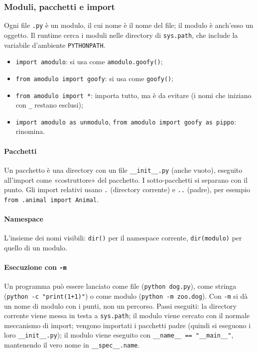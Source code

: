 \documentclass[a4paper,12pt]{article}
\begin{document}
\subsubsection{Moduli, pacchetti e import}
Ogni file \texttt{.py} è un modulo, il cui nome è il nome del file; il modulo è anch'esso
un oggetto. Il runtime cerca i moduli nelle directory di \texttt{sys.path}, che include
la variabile d'ambiente \texttt{PYTHONPATH}.
\begin{itemize}[nosep]
  \item \texttt{import amodulo}: si usa come \texttt{amodulo.goofy()};
  \item \texttt{from amodulo import goofy}: si usa come \texttt{goofy()};
  \item \texttt{from amodulo import *}: importa tutto, ma è da evitare (i nomi che iniziano
        con \texttt{\_} restano esclusi);
  \item \texttt{import amodulo as unmodulo}, \texttt{from amodulo import goofy as pippo}:
        rinomina.
\end{itemize}

\paragraph{Pacchetti} Un pacchetto è una directory con un file \texttt{\_\_init\_\_.py}
(anche vuoto), eseguito all'import come «costruttore» del pacchetto. I sotto-pacchetti si
separano con il punto. Gli import relativi usano \texttt{.} (directory corrente) e
\texttt{..} (padre), per esempio \texttt{from .animal import Animal}.

\paragraph{Namespace} L'insieme dei nomi visibili: \texttt{dir()} per il namespace corrente,
\texttt{dir(modulo)} per quello di un modulo.

\paragraph{Esecuzione con \texttt{-m}} Un programma può essere lanciato come file
(\texttt{python dog.py}), come stringa (\texttt{python -c "print(1+1)"}) o come modulo
(\texttt{python -m zoo.dog}). Con \texttt{-m} si dà un nome di modulo con i punti, non un
percorso. Passi eseguiti: la directory corrente viene messa in testa a \texttt{sys.path};
il modulo viene cercato con il normale meccanismo di import; vengono importati i pacchetti
padre (quindi si eseguono i loro \texttt{\_\_init\_\_.py}); il modulo viene eseguito con
\texttt{\_\_name\_\_ == "\_\_main\_\_"}, mantenendo il vero nome in \texttt{\_\_spec\_\_.name}.
\end{document}
